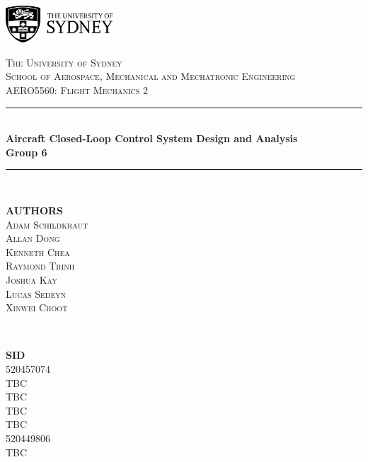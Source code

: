 \documentclass[11pt]{article}
\title{}
\begin{document}
\begin{titlepage}

\newcommand{\HRule}{\rule{\linewidth}{0.5mm}} 
\begin{flushright}
\includegraphics[width=0.3\textwidth]{images/usydNew.png}\\[2cm]
\end{flushright}

\center 


\textsc{\LARGE The University of Sydney}\\[0.75cm]
\textsc{\Large School of Aerospace, Mechanical and Mechatronic Engineering}\\[1cm]

\textsc{\Large AERO5560: Flight Mechanics 2}\\[0.25cm] 


\HRule \\[0.4cm]
{ \huge \bfseries Aircraft Closed-Loop Control System Design and Analysis}\\[0.4cm] 
{ \Large \bfseries Group 6 }\\[0.2cm] 
\HRule \\[1.25cm]
 

\begin{minipage}{0.4\textwidth}
\begin{flushleft} \large
\textsc{\textbf{AUTHORS}}\\

\textsc{Adam Schildkraut}\\
\textsc{Allan Dong}\\
\textsc{Kenneth Chea}\\
\textsc{Raymond Trinh}\\
\textsc{Joshua Kay}\\
\textsc{Lucas Sedeyn}\\
\textsc{Xinwei Choot}\\

\end{flushleft}
\end{minipage}
~
\begin{minipage}{0.4\textwidth}
\begin{flushright} \large\textbf{SID}\\
\textsc{520457074}\\
\textsc{TBC}\\
\textsc{TBC}\\
\textsc{TBC}\\
\textsc{TBC}\\
\textsc{520449806}\\
\textsc{TBC}\\

\end{flushright}
\end{minipage}\\[1.5cm]

\vfill

\end{titlepage}
\newpage
{}
\cfoot{}
\rhead{}
\thispagestyle{fancy}
\pagestyle{fancy}
\setcounter{page}{1}
\end{document}
